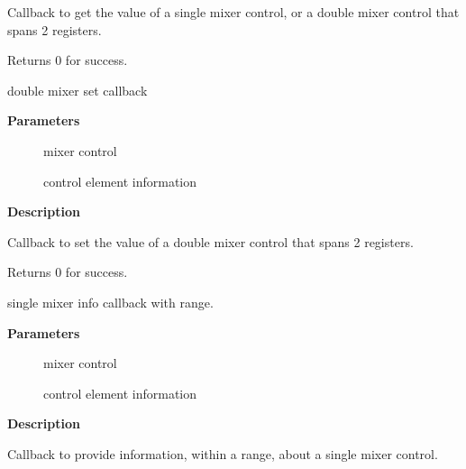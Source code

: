 \documentclass[a4paper,8pt,english]{sphinxmanual}
\begin{document}
Callback to get the value of a single mixer control, or a double mixer
control that spans 2 registers.

Returns 0 for success.

\begin{fulllineitems}
\label{sound/kernel-api/alsa-driver-api:c.snd_soc_put_volsw_sx}
double mixer set callback

\end{fulllineitems}


\textbf{Parameters}
\begin{description}
\item[{}] \leavevmode
mixer control

\item[{}] \leavevmode
control element information

\end{description}

\textbf{Description}

Callback to set the value of a double mixer control that spans 2 registers.

Returns 0 for success.

\begin{fulllineitems}
\label{sound/kernel-api/alsa-driver-api:c.snd_soc_info_volsw_range}
single mixer info callback with range.

\end{fulllineitems}


\textbf{Parameters}
\begin{description}
\item[{}] \leavevmode
mixer control

\item[{}] \leavevmode
control element information

\end{description}

\textbf{Description}

Callback to provide information, within a range, about a single
mixer control.
\end{document}
